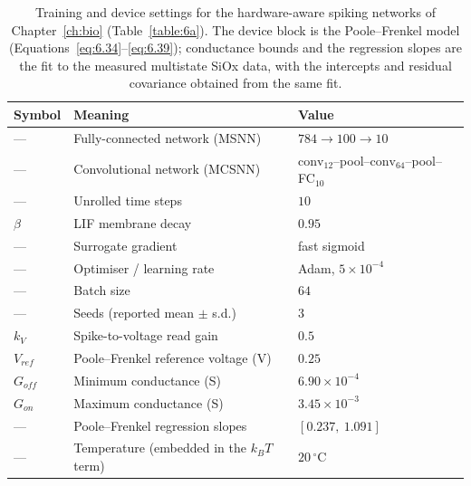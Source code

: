 \begin{table}[htbp!]
    \caption[Hardware-aware spiking-classifier settings.]{Training and device settings
    for the hardware-aware spiking networks of Chapter~\ref{ch:bio} (Table~\ref{table:6a}).
    The device block is the Poole--Frenkel model (Equations~\ref{eq:6.34}--\ref{eq:6.39});
    conductance bounds and the regression slopes are the fit to the measured multistate
    SiOx data, with the intercepts and residual covariance obtained from the same fit.}
    \begin{center}
    \small
    \begin{tabularx}{\textwidth}{@{}l X l@{}}
    \toprule
    Symbol & Meaning & Value \\
    \midrule
    ---            & Fully-connected network (MSNN)                 & $784\to100\to10$ \\
    ---            & Convolutional network (MCSNN)                  & $\text{conv}_{12}$--pool--$\text{conv}_{64}$--pool--FC$_{10}$ \\
    ---            & Unrolled time steps                            & $10$ \\
    $\beta$        & LIF membrane decay                             & $0.95$ \\
    ---            & Surrogate gradient                             & fast sigmoid \\
    ---            & Optimiser / learning rate                      & Adam, $5\times10^{-4}$ \\
    ---            & Batch size                                     & $64$ \\
    ---            & Seeds (reported mean $\pm$ s.d.)               & $3$ \\
    \midrule
    $k_V$          & Spike-to-voltage read gain                     & $0.5$ \\
    $V_{ref}$      & Poole--Frenkel reference voltage (V)           & $0.25$ \\
    $G_{off}$      & Minimum conductance (S)                        & $6.90\times10^{-4}$ \\
    $G_{on}$       & Maximum conductance (S)                        & $3.45\times10^{-3}$ \\
    ---            & Poole--Frenkel regression slopes               & $[0.237,\ 1.091]$ \\
    ---            & Temperature (embedded in the $k_BT$ term)      & $20\,^{\circ}\text{C}$ \\

\end{tabularx}
\end{center}
\end{table}

